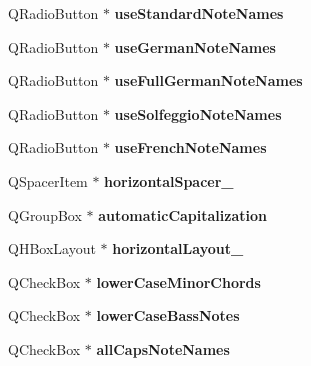 \begin{DoxyCompactItemize}
Q\+Radio\+Button $\ast$ {\bfseries use\+Standard\+Note\+Names}
\item 
\mbox{\label{class_ui___edit_style_base_a651fb771f5bddbcb376488b1d44a4c03}} 
Q\+Radio\+Button $\ast$ {\bfseries use\+German\+Note\+Names}
\item 
\mbox{\label{class_ui___edit_style_base_a531b31590dd02eb27b90459979eab8f7}} 
Q\+Radio\+Button $\ast$ {\bfseries use\+Full\+German\+Note\+Names}
\item 
\mbox{\label{class_ui___edit_style_base_af63c768fdefff014ee9ccb63128c4bb1}} 
Q\+Radio\+Button $\ast$ {\bfseries use\+Solfeggio\+Note\+Names}
\item 
\mbox{\label{class_ui___edit_style_base_ac5b7f661cd630e3d8f6f0cd140f1e750}} 
Q\+Radio\+Button $\ast$ {\bfseries use\+French\+Note\+Names}
\item 
\mbox{\label{class_ui___edit_style_base_aa2af9e1e877862c5843c0819d6206bfb}} 
Q\+Spacer\+Item $\ast$ {\bfseries horizontal\+Spacer\+\_}
\item 
\mbox{\label{class_ui___edit_style_base_a657669dc08758ddd1d9195da8d50d0c7}} 
Q\+Group\+Box $\ast$ {\bfseries automatic\+Capitalization}
\item 
\mbox{\label{class_ui___edit_style_base_a38f056b57b6b62dc8f4bd3e9c3de6a08}} 
Q\+H\+Box\+Layout $\ast$ {\bfseries horizontal\+Layout\+\_}
\item 
\mbox{\label{class_ui___edit_style_base_a586eef4dd894e02d8897cc3827ffa5e6}} 
Q\+Check\+Box $\ast$ {\bfseries lower\+Case\+Minor\+Chords}
\item 
\mbox{\label{class_ui___edit_style_base_a1ea8e7c4567e143018b6e8175df661db}} 
Q\+Check\+Box $\ast$ {\bfseries lower\+Case\+Bass\+Notes}
\item 
\mbox{\label{class_ui___edit_style_base_aee5502686edd948d977032e0888c5357}} 
Q\+Check\+Box $\ast$ {\bfseries all\+Caps\+Note\+Names}

\end{DoxyCompactItemize}
